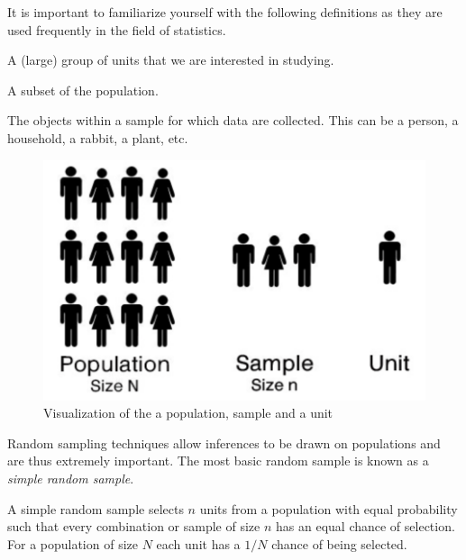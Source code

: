 It is important to familiarize yourself with the following definitions as they are used frequently in the field of statistics.

\begin{definition}[Population]	
A (large) group of units that we are interested in studying.
\end{definition}

\begin{definition}[Sample]		
A subset of the population.
\end{definition}

\begin{definition}[Unit]
The objects within a sample for which data are collected. This can be a person, a household, a rabbit, a plant, etc.
\end{definition}

\begin{figure}[H]
	\centering
	\includegraphics[scale=0.75]{Section1/popsampleunit.pdf}
	\caption{Visualization of the a population, sample and a unit}
\end{figure}

\noindent
Random sampling techniques allow inferences to be drawn on populations and are thus extremely important. The most basic random sample is known as a \textit{simple random sample}.

\begin{definition}
A simple random sample selects $n$ units from a population with equal probability such that every combination or sample of size $n$ has an equal chance of selection. For a population of size $N$ each unit has a $1/N$ chance of being selected.
\end{definition}

